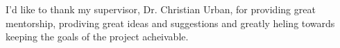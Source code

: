 I'd like to thank my supervisor, Dr. Christian Urban, for providing great mentorship, prodiving
great ideas and suggestions and greatly heling towards keeping the goals of the project acheivable.

